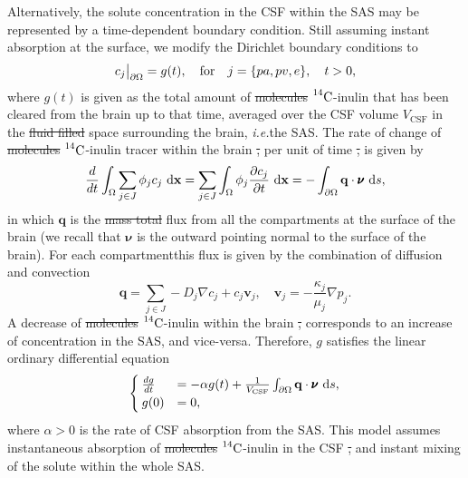 \documentclass[a4paper,11pt]{article} %
\newcommand\restr[2]{{%
\left.\kern-\nulldelimiterspace %
#1 %
\vphantom{\big|} %
\right|_{#2} %
}}
\newcommand{\ie}{\emph{i.e.}\;}
\newcommand{\1}{^{(1)}}
\newcommand{\2}{^{(2)}}
\newcommand*{\dd}{\mathop{\kern0pt\mathrm{d}}\!{}}
\newcommand {\x}   {\mathbf{x}}
\newcommand{\Cinulin}{$\prescript{14}{}{\text{C}}$-inulin }
\providecommand{\DIFaddtex}[1]{{\protect\color{blue}\uwave{#1}}} %
\providecommand{\DIFdeltex}[1]{{\protect\color{red}\sout{#1}}}                      %
\providecommand{\DIFaddbegin}{} %
\providecommand{\DIFaddend}{} %
\providecommand{\DIFdelbegin}{} %
\providecommand{\DIFdelend}{} %
\providecommand{\DIFadd}[1]{\texorpdfstring{\DIFaddtex{#1}}{#1}} %
\providecommand{\DIFdel}[1]{\texorpdfstring{\DIFdeltex{#1}}{}} %
\newcommand{\DIFscaledelfig}{0.5}
\newlength{\DIFdelgraphicswidth} %
\newlength{\DIFdelgraphicsheight} %
\newcommand{\DIFaddincludegraphics}[2][]{{\color{blue}\fbox{\DIFOincludegraphics[#1]{#2}}}} %
\newcommand{\DIFdelincludegraphics}[2][]{%
\sbox{\DIFdelgraphicsbox}{\DIFOincludegraphics[#1]{#2}}%
\settoboxwidth{\DIFdelgraphicswidth}{\DIFdelgraphicsbox} %
\settoboxtotalheight{\DIFdelgraphicsheight}{\DIFdelgraphicsbox} %
\scalebox{\DIFscaledelfig}{%
\parbox[b]{\DIFdelgraphicswidth}{\usebox{\DIFdelgraphicsbox}\\[-\baselineskip] \rule{\DIFdelgraphicswidth}{0em}}\llap{\resizebox{\DIFdelgraphicswidth}{\DIFdelgraphicsheight}{%
\setlength{\unitlength}{\DIFdelgraphicswidth}%
\begin{picture}(1,1)%
\thicklines\linethickness{2pt} %
{\color[rgb]{1,0,0}\put(0,0){\framebox(1,1){}}}%
{\color[rgb]{1,0,0}\put(0,0){\line( 1,1){1}}}%
{\color[rgb]{1,0,0}\put(0,1){\line(1,-1){1}}}%
\end{picture}%
}\hspace*{3pt}}} %
} %
\DeclareRobustCommand{\DIFaddbegin}{\DIFOaddbegin \let\includegraphics\DIFaddincludegraphics} %
\DeclareRobustCommand{\DIFaddend}{\DIFOaddend \let\includegraphics\DIFOincludegraphics} %
\DeclareRobustCommand{\DIFdelbegin}{\DIFOdelbegin \let\includegraphics\DIFdelincludegraphics} %
\DeclareRobustCommand{\DIFdelend}{\DIFOaddend \let\includegraphics\DIFOincludegraphics} %
\begin{document}
Alternatively, the solute concentration in the CSF within the SAS may be represented by a time-dependent boundary condition. Still assuming instant absorption at the surface, we modify the Dirichlet boundary conditions to
\begin{equation}
     \restr{c_j}{\partial \Omega} =  g(t),\quad \text{for}\quad j=\{pa,pv,e \}, \quad t >0,
    \label{eq:inulin-inhomogeneous-dirichlet}
\end{equation}
where $ g(t)$ is given as the total amount of \DIFdelbegin \DIFdel{molecules }\DIFdelend \DIFaddbegin \Cinulin \DIFaddend that has been cleared from the brain up to that time, averaged over the CSF volume $ V_\text{CSF} $ in the \DIFdelbegin \DIFdel{fluid filled }\DIFdelend \DIFaddbegin \DIFadd{fluid-filled }\DIFaddend space surrounding the brain, \ie the SAS. The rate of change of \DIFdelbegin \DIFdel{molecules }\DIFdelend \DIFaddbegin \Cinulin \DIFaddend tracer within the brain \DIFdelbegin \DIFdel{, }\DIFdelend per unit of time \DIFdelbegin \DIFdel{, }\DIFdelend is given by
\begin{equation}
    \frac{d}{dt}\int_{\Omega} \sum_{j\in J} \phi_j c_j \,\dd \x= \sum_{j\in J} \int_{\Omega} \phi_j \frac{\partial c_j}{\partial t} \,\dd \x=   - \int_{\partial \Omega}  \mathbf{q} \cdot \pmb{\nu} \,\dd s  ,
\end{equation}
in which $\mathbf{q}$ is the \DIFdelbegin \DIFdel{mass total }\DIFdelend \DIFaddbegin \DIFadd{total mass }\DIFaddend flux from all the compartments at the surface of the brain (we recall that $\pmb{\nu}$ is the outward pointing normal to the surface of the brain). 
For each compartment\DIFaddbegin \DIFadd{, }\DIFaddend this flux is given by the combination of diffusion and convection 
\[
    \mathbf{q} =  \sum_{j\in J}  - D_j\nabla c_j + c_j \mathbf{v}_j,\quad \mathbf{v}_j = -\frac{\kappa_j}{\mu_j}\nabla p_j.   
\]
A decrease of \DIFdelbegin \DIFdel{molecules }\DIFdelend \DIFaddbegin \Cinulin \DIFaddend within the brain \DIFdelbegin \DIFdel{, }\DIFdelend corresponds to an increase of concentration in the SAS, and vice-versa. Therefore, $g$ satisfies the linear ordinary differential equation 
\begin{equation}
    \begin{cases}
        \frac{dg}{dt} &= - \alpha g(t)  + \frac{1}{V_\text{CSF}} \int_{\partial \Omega}  \mathbf{q} \cdot\pmb{\nu}\,\dd s, \\
        g(0) &= 0,
    \end{cases}
    \label{eq:inulin-boundary-inhomogeneous}
\end{equation}
where $\alpha > 0$ is the rate of CSF absorption from the SAS. 
This model assumes instantaneous absorption of \DIFdelbegin \DIFdel{molecules }\DIFdelend \DIFaddbegin \Cinulin \DIFaddend in the CSF \DIFdelbegin \DIFdel{, }\DIFdelend and instant mixing of the solute within the whole SAS. 
\end{document}

